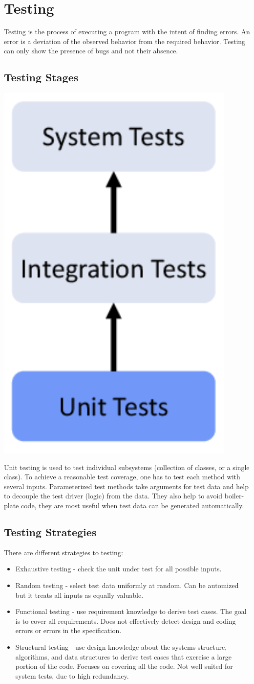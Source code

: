 \section{Testing}

Testing is the process of executing a program with the intent of finding errors. An error is a deviation of the observed behavior from the required behavior. Testing can only show the presence of bugs and not their absence.


\subsection{Testing Stages}
\begin{center}
	\includegraphics[width=0.2\columnwidth]{assets/testing_stages}
\end{center}

Unit testing is used to test individual subsystems (collection of classes, or a single class). To achieve a reasonable test coverage, one has to test each method with several inputs. Parameterized test methods take arguments for test data and help to decouple the test driver (logic) from the data. They also help to avoid boiler-plate code, they are most useful when test data can be generated automatically.


\subsection{Testing Strategies}

There are different strategies to testing:
\begin{itemize}
	\item Exhaustive testing - check the unit under test for all possible inputs.
	\item Random testing - select test data uniformly at random. Can be automized but it treats all inputs as equally valuable.
	\item Functional testing - use requirement knowledge to derive test cases. The goal is to cover all requirements. Does not effectively detect design and coding errors or errors in the specification.
	\item Structural testing - use design knowledge about the systems structure, algorithms, and data structures to derive test cases that exercise a large portion of the code. Focuses on covering all the code. Not well suited for system tests, due to high redundancy.
\end{itemize}

